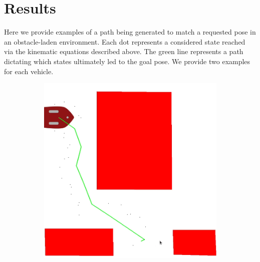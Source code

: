 \documentclass{article}
\begin{document}
\section*{Results}

Here we provide examples of a path being generated to match a requested pose in an obstacle-laden environment. Each dot represents a considered state reached via the kinematic equations described above. The green line represents a path dictating which states ultimately led to the goal pose. We provide two examples for each vehicle.

\begin{figure}[H]
    \centering
    \begin{subfigure}{0.4\textwidth}
        \centering
        \includegraphics[width = \textwidth]{imgs/path_skid_1.png}
    \end{subfigure}
    \begin{subfigure}{0.4\textwidth}
        \centering

\end{subfigure}
\end{figure}
\end{document}
